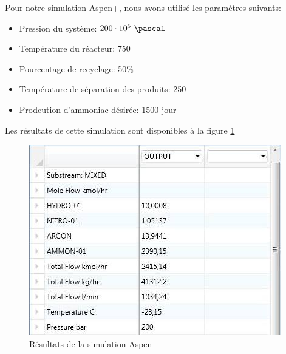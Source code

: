 Pour notre simulation Aspen+, nous avons utilisé les paramètres suivants:
\begin{itemize}
	\item Pression du système: $200\cdot10^5\ \pascal$
	\item Température du réacteur: 750 \kelvin
	\item Pourcentage de recyclage: 50\%
	\item Température de séparation des produits: 250 \kelvin
	\item Prodcution d'ammoniac désirée: 1500 \ton \per jour
\end{itemize}

Les résultats de cette simulation sont disponibles à la figure \ref{Aspen_results}
\\
\begin{figure}[h]
	\begin{center}
	\includegraphics[scale=0.6]{task2/Aspen_results_img}
	\end{center}
	\caption{Résultats de la simulation Aspen+}
	\label{Aspen_results}
\end{figure}
	